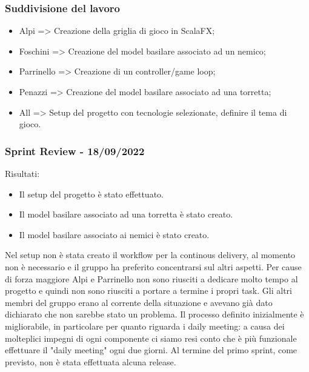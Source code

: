 \subsubsection*{Suddivisione del lavoro}
\begin{itemize}
  \item Alpi => Creazione della griglia di gioco in ScalaFX;
  \item Foschini => Creazione del model basilare associato ad un nemico;
  \item Parrinello => Creazione di un controller/game loop;
  \item Penazzi => Creazione del model basilare associato ad una torretta;
  \item All => Setup del progetto con tecnologie selezionate, definire il tema di gioco.
\end{itemize}

\subsubsection{Sprint Review - 18/09/2022}
Risultati:
\begin{itemize}
  \item Il setup del progetto è stato effettuato.
  \item Il model basilare associato ad una torretta è stato creato.
  \item Il model basilare associato ai nemici è stato creato.
\end{itemize}

Nel setup non è stata creato il workflow per la continous delivery, al momento non è necessario e il gruppo ha preferito concentrarsi sul altri aspetti.
Per cause di forza maggiore Alpi e Parrinello non sono riusciti a dedicare molto tempo al progetto e quindi non sono riusciti a portare a termine i propri task. Gli altri membri del gruppo erano al corrente della situazione e avevano già dato dichiarato che non sarebbe stato un problema.
Il processo definito inizialmente è migliorabile, in particolare per quanto riguarda i daily meeting: a causa dei molteplici impegni di ogni componente ci siamo resi conto che è più funzionale effettuare il "daily meeting" ogni due giorni.
Al termine del primo sprint, come previsto, non è stata effettuata alcuna release.

\newpage
